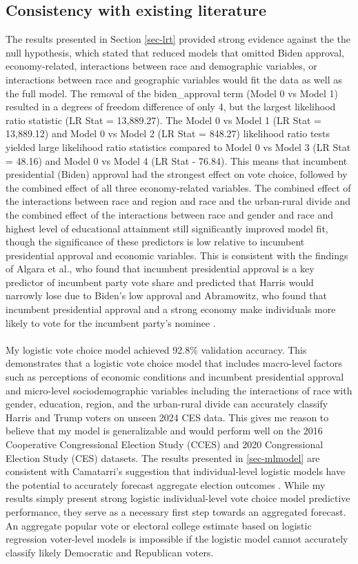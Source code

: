 \documentclass[letter]{article}
\begin{document}
\subsection{Consistency with existing literature}
The results presented in Section \ref{sec-lrt} provided strong evidence against the the null hypothesis, which stated that reduced models that omitted Biden approval, economy-related, interactions between race and demographic variables, or interactions between race and geographic variables would fit the data as well as the full model. The removal of the biden\_approval term (Model 0 vs Model 1) resulted in a degrees of freedom difference of only 4, but the largest likelihood ratio statistic (LR Stat = 13,889.27). The Model 0 vs Model 1 (LR Stat = 13,889.12) and Model 0 vs Model 2 (LR Stat = 848.27) likelihood ratio tests yielded large likelihood ratio statistics compared to Model 0 vs Model 3 (LR Stat = 48.16) and Model 0 vs Model 4 (LR Stat - 76.84). This means that incumbent presidential (Biden) approval had the strongest effect on vote choice, followed by the combined effect of all three economy-related variables. The combined effect of the interactions between race and region and race and the urban-rural divide and the combined effect of the interactions between race and gender and race and highest level of educational attainment still significantly improved model fit, though the significance of these predictors is low relative to incumbent presidential approval and economic variables. This is consistent with the findings of Algara et al., who found that incumbent presidential approval is a key predictor of incumbent party vote share and predicted that Harris would narrowly lose due to Biden's low approval and Abramowitz, who found that incumbent presidential approval and a strong economy make individuals more likely to vote for the incumbent party's nominee  \cite{algara} \cite{abramowitz}. \\
\\
My logistic vote choice model achieved 92.8\% validation accuracy. This demonstrates that a logistic vote choice model that includes macro-level factors such as perceptions of economic conditions and incumbent presidential approval and micro-level sociodemographic variables including the interactions of race with gender, education, region, and the urban-rural divide can accurately classify Harris and Trump voters on unseen 2024 CES data. This gives me reason to believe that my model is generalizable and would perform well on the 2016 Cooperative Congressional Election Study (CCES) and 2020 Congressional Election Study (CES) datasets. The results presented in \ref{sec-mlmodel} are consistent with Camatarri's suggestion that individual-level logistic models have the potential to accurately forecast aggregate election outcomes \cite{camatarri}. While my results simply present strong logistic individual-level vote choice model predictive performance, they serve as a necessary first step towards an aggregated forecast. An aggregate popular vote or electoral college estimate based on logistic regression voter-level models is impossible if the logistic model cannot accurately classify likely Democratic and Republican voters. 
\end{document}
